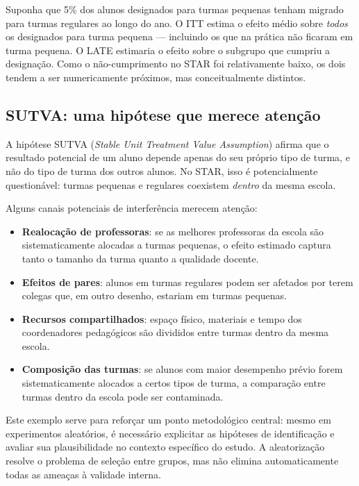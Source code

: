 \begin{exemplobox}
Suponha que 5\% dos alunos designados para turmas pequenas tenham migrado para turmas regulares ao longo do ano. O ITT estima o efeito médio sobre \textit{todos} os designados para turma pequena --- incluindo os que na prática não ficaram em turma pequena. O LATE estimaria o efeito sobre o subgrupo que cumpriu a designação. Como o não-cumprimento no STAR foi relativamente baixo, os dois tendem a ser numericamente próximos, mas conceitualmente distintos.
\end{exemplobox}

\subsection*{SUTVA: uma hipótese que merece atenção}

A hipótese SUTVA (\textit{Stable Unit Treatment Value Assumption}) afirma que o resultado potencial de um aluno depende apenas do seu próprio tipo de turma, e não do tipo de turma dos outros alunos. No STAR, isso é potencialmente questionável: turmas pequenas e regulares coexistem \textit{dentro} da mesma escola.

Alguns canais potenciais de interferência merecem atenção:

\begin{itemize}[leftmargin=*]
  \item \textbf{Realocação de professoras}: se as melhores professoras da escola são sistematicamente alocadas a turmas pequenas, o efeito estimado captura tanto o tamanho da turma quanto a qualidade docente.
  \item \textbf{Efeitos de pares}: alunos em turmas regulares podem ser afetados por terem colegas que, em outro desenho, estariam em turmas pequenas.
  \item \textbf{Recursos compartilhados}: espaço físico, materiais e tempo dos coordenadores pedagógicos são divididos entre turmas dentro da mesma escola.
  \item \textbf{Composição das turmas}: se alunos com maior desempenho prévio forem sistematicamente alocados a certos tipos de turma, a comparação entre turmas dentro da escola pode ser contaminada.
\end{itemize}

Este exemplo serve para reforçar um ponto metodológico central: mesmo em experimentos aleatórios, é necessário explicitar as hipóteses de identificação e avaliar sua plausibilidade no contexto específico do estudo. A aleatorização resolve o problema de seleção entre grupos, mas não elimina automaticamente todas as ameaças à validade interna.

